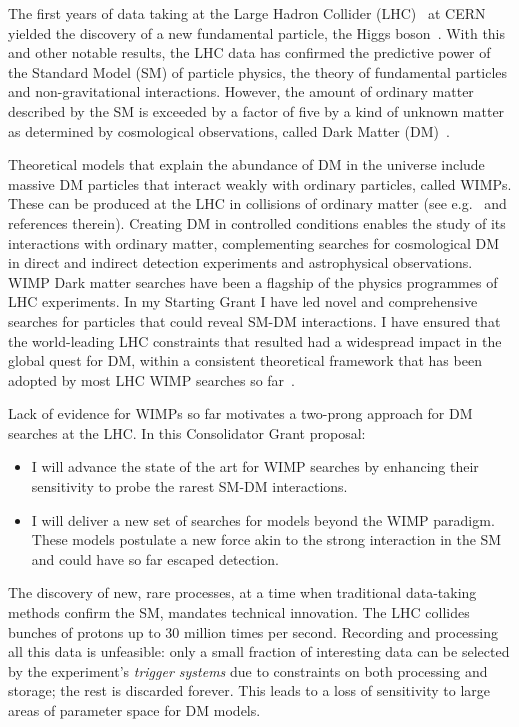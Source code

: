 \documentclass[11pt,a4paper]{article}
\begin{document}
The first years of data taking at the Large Hadron Collider (LHC)~\cite{LHC2008} at CERN yielded the discovery of a new fundamental particle, the Higgs boson~\cite{Khachatryan:2016vau}. With this and other notable results, the LHC data has confirmed the predictive power of the Standard Model (SM) of particle physics, the theory of fundamental particles and non-gravitational interactions. However, the amount of ordinary matter described by the SM is exceeded by a factor of five by a kind of unknown matter as determined by cosmological observations, called Dark Matter (DM)~\cite{Bertone:2016nfn}. 


Theoretical models that explain the abundance of DM in the universe include massive DM particles that interact weakly with ordinary particles, called WIMPs. These can be produced at the LHC in collisions of ordinary matter (see e.g.~\cite{Boveia:2018yeb} and references therein). 
Creating DM in controlled conditions enables the study of its interactions with ordinary matter, complementing searches for cosmological DM in direct and indirect detection experiments and astrophysical observations. %
WIMP Dark matter searches have been a flagship of the physics programmes of LHC experiments. In my Starting Grant I have led novel and comprehensive searches for particles that could reveal SM-DM interactions. I have ensured that the world-leading LHC constraints that resulted had a widespread impact in the global quest for DM, within a consistent theoretical framework that has been adopted by most LHC WIMP searches so far~\cite{DMWG}.  

Lack of evidence for WIMPs so far motivates a two-prong approach for DM searches at the LHC. In this Consolidator Grant proposal:
\begin{itemize}
    \item I will advance the state of the art for WIMP searches by enhancing their sensitivity to probe the rarest SM-DM interactions.
    \item I will deliver a new set of searches for models beyond the WIMP paradigm. These models postulate a new force akin to the strong interaction in the SM and could have so far escaped detection. 
\end{itemize}

The discovery of new, rare processes, at a time when traditional data-taking methods confirm the SM, mandates technical innovation. The LHC collides bunches of protons up to 30 million times per second. Recording and processing all this data is unfeasible: only a small fraction of interesting data can be selected by the experiment’s \textit{trigger systems} due to constraints on both processing and storage; the rest is discarded forever. This leads to a loss of sensitivity to large areas of parameter space for DM models. 
\end{document}
